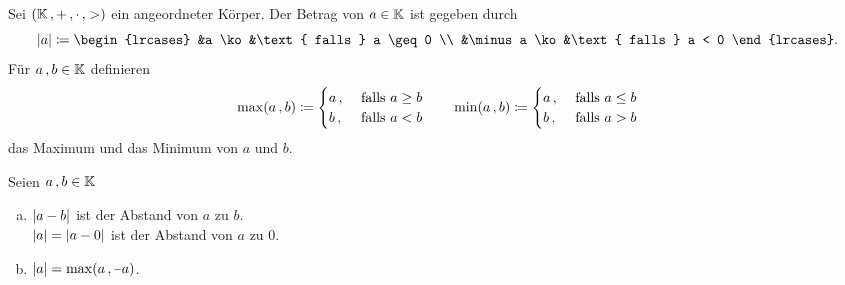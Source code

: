 \documentclass[../ana1.tex]{subfiles}
\begin{document}
\begin{defi}[Betrag]
	Sei \((\mathbb{K} \operatorname{,} + \operatorname{,} \cdot \operatorname{,} >)\) ein angeordneter Körper. Der Betrag von 
	\(a \in \mathbb{K}\) ist gegeben durch
	\[\abs{a} \coloneqq
		\begin{lrcases}
			&a \ko  &\text{ falls } a \geq 0 \\
			&\minus a \ko &\text{ falls } a < 0
		\end{lrcases}.\]
	Für \(a \operatorname{,} b \in \mathbb{K}\) definieren
	\[\max(a \operatorname{,} b) \coloneqq
		\begin{cases}
			a \operatorname{,} &\text{ falls } a \geq b \\
			b \operatorname{,} &\text{ falls } a < b
		\end{cases}
		\qquad
	  \min(a \operatorname{,} b) \coloneqq
		\begin{cases}
			a \operatorname{,} &\text{ falls } a \leq b \\
			b \operatorname{,} &\text{ falls } a > b
		\end{cases}\]
	das Maximum und das Minimum von \(a\) und \(b\).
\end{defi}

\begin{bem}\label{bem:abstand}
	Seien \(a \operatorname{,} b \in \mathbb{K}\)
	\begin{enumerate}[(a)]
		\item \(\left|a - b\right|\) ist der Abstand von \(a\) zu \(b\).\\
		      \(\left|a\right| = \left|a - 0\right|\) ist der Abstand von \(a\) zu \(0\).
		\item \(\abs{a} = \max(a \ko \minus a)\).
	\end{enumerate}
\end{bem}

\iftoggle{short}{}{\newpage}%
\end{document}
